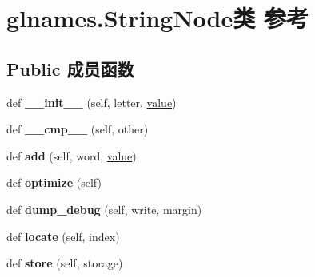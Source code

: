 \hypertarget{classglnames_1_1_string_node}{}\section{glnames.\+String\+Node类 参考}
\label{classglnames_1_1_string_node}
\subsection*{Public 成员函数}
\begin{DoxyCompactItemize}
\item 
\mbox{\label{classglnames_1_1_string_node_a79f323cd108cae272209ab45b903e001}} 
def {\bfseries \+\_\+\+\_\+init\+\_\+\+\_\+} (self, letter, \hyperlink{unionvalue}{value})
\item 
\mbox{\label{classglnames_1_1_string_node_a1a43959e93f45214090f30ce6f0e030c}} 
def {\bfseries \+\_\+\+\_\+cmp\+\_\+\+\_\+} (self, other)
\item 
\mbox{\label{classglnames_1_1_string_node_aafbb6bb2e5dd17967c2f3d7394bb41ea}} 
def {\bfseries add} (self, word, \hyperlink{unionvalue}{value})
\item 
\mbox{\label{classglnames_1_1_string_node_a08419a249796945f53f37d66f58338af}} 
def {\bfseries optimize} (self)
\item 
\mbox{\label{classglnames_1_1_string_node_ac36f524d60f13491883a2876cc3fa55b}} 
def {\bfseries dump\+\_\+debug} (self, write, margin)
\item 
\mbox{\label{classglnames_1_1_string_node_a84c7c2b9b930fea6eff2547fa3da7124}} 
def {\bfseries locate} (self, index)
\item 
\mbox{\label{classglnames_1_1_string_node_a8e3a70942a4f6b4ca4040de2c47fc483}} 
def {\bfseries store} (self, storage)
\end{DoxyCompactItemize}
